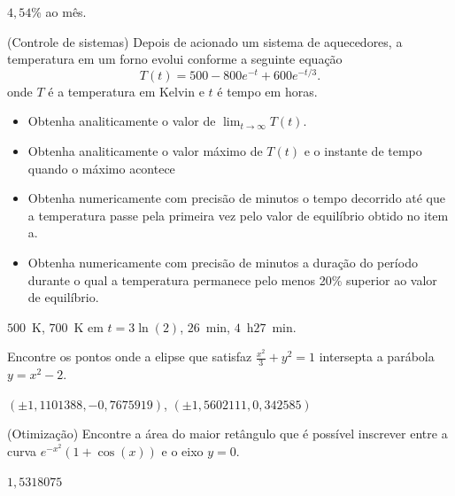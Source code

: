 \begin{resp}

$4,54$\% ao mês.

\end{resp}


\begin{exer}(Controle de sistemas) Depois de acionado um sistema de aquecedores, a temperatura em um forno  evolui conforme a seguinte equação
\begin{equation} T(t)=500-800e^{-t}+600e^ {-t/3}. \end{equation}
onde $T$ é a temperatura em Kelvin e $t$ é tempo em horas.
\begin{itemize}
\item[a)] Obtenha analiticamente o valor de $\lim_{t\to\infty}T(t)$.
\item[b)] Obtenha analiticamente o valor máximo de $T(t)$ e o instante de tempo quando o máximo acontece
\item[c)] Obtenha numericamente com precisão de minutos o tempo decorrido até que a temperatura passe pela primeira vez pelo valor de equilíbrio obtido no item a.
\item[c)] Obtenha numericamente com precisão de minutos a duração do período durante o qual a temperatura permanece pelo menos 20\% superior ao valor de equilíbrio.
\end{itemize}
\end{exer}

\begin{resp}

$500$~K, $700$~K em $t=3\ln(2)$, $26$~min, $4$~h$27$~min.

\end{resp}

\begin{exer} Encontre os pontos onde a elipse que satisfaz $\frac{x^2}{3}+y^2=1$ intersepta a parábola $y=x^2-2$.
\end{exer}
\begin{resp}

$\left(\pm 1,1101388, -0,7675919\right)$, $\left(\pm 1,5602111, 0,342585\right)$

\end{resp}

\begin{exer}(Otimização) Encontre a área do maior retângulo que é possível inscrever entre a curva $e^{-x^2}\left(1+\cos(x)\right)$ e o eixo $y=0$.
\end{exer}
\begin{resp}

$1,5318075$

\end{resp}


